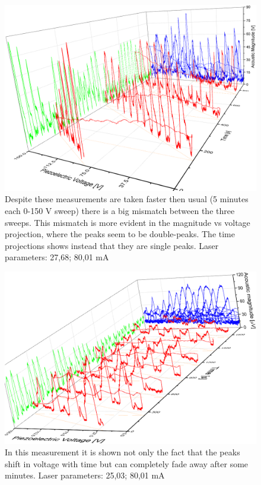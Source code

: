 \begin{landscape}
\begin{figure}[!bhtp]\centering
\includegraphics[height=\textheight, draft=\foto]{eps/3mismatching.eps}
\caption{Despite these measurements are taken faster then usual (5 minutes each 0-150 V sweep) there is a big mismatch between the three sweeps. This mismatch is more evident in the magnitude vs voltage projection, where the peaks seem to be double-peaks. The time projections shows instead that they are
single peaks. Laser parameters: 27,68\cel; 80,01 mA}
\label{3missweep}
\end{figure}\vfill
\end{landscape}

\begin{landscape}
\begin{figure}[!bhtp]\centering
\includegraphics[height=\textheight, draft=\foto]{eps/7sweeps.eps}
\caption{In this measurement it is shown not only the fact that the peaks shift in voltage with time but can completely fade away after some minutes. Laser parameters: 25,03\cel; 80,01 mA}
\label{7sweeps}
\end{figure}\vfill
\end{landscape}
  

